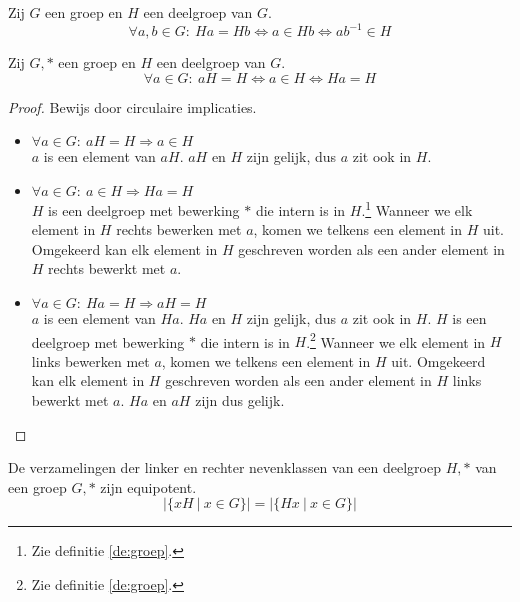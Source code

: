 \documentclass[main.tex]{subfiles}
\begin{document}
\begin{ei}
  \label{ei:rechter-nevenklasse-eig}
  Zij $G$ een groep en $H$ een deelgroep van $G$.
  \[ \forall a,b \in G:\ Ha = Hb \Leftrightarrow a \in Hb \Leftrightarrow ab^{-1} \in H \]

\end{ei}

\begin{ei}
  \label{ei:nevenklasse-eigen-element-gelijk}
  Zij $G,*$ een groep en $H$ een deelgroep van $G$.
  \[ \forall a \in G:\ aH = H \Leftrightarrow a \in H \Leftrightarrow Ha = H \]

  \begin{proof}
    Bewijs door circulaire implicaties.
    \begin{itemize}
    \item $\forall a \in G:\ aH = H \Rightarrow a \in H$\\
      $a$ is een element van $aH$. $aH$ en $H$ zijn gelijk, dus $a$ zit ook in $H$.
    \item $\forall a \in G:\ a \in H \Rightarrow Ha = H$\\
      $H$ is een deelgroep met bewerking $*$ die intern is in $H$.\footnote{Zie definitie \ref{de:groep}.}
      Wanneer we elk element in $H$ rechts bewerken met $a$, komen we telkens een element in $H$ uit.
      Omgekeerd kan elk element in $H$ geschreven worden als een ander element in $H$ rechts bewerkt met $a$.
    \item $\forall a \in G:\ Ha = H \Rightarrow aH = H$\\
      $a$ is een element van $Ha$. $Ha$ en $H$ zijn gelijk, dus $a$ zit ook in $H$.
      $H$ is een deelgroep met bewerking $*$ die intern is in $H$.\footnote{Zie definitie \ref{de:groep}.}
      Wanneer we elk element in $H$ links bewerken met $a$, komen we telkens een element in $H$ uit.
      Omgekeerd kan elk element in $H$ geschreven worden als een ander element in $H$ links bewerkt met $a$.
      $Ha$ en $aH$ zijn dus gelijk.
    \end{itemize}
  \end{proof}
\end{ei}

\begin{st}
  De verzamelingen der linker en rechter nevenklassen van een deelgroep $H,*$ van een groep $G,*$ zijn equipotent.
  \[ |\{ xH\ |\ x \in G \}| = |\{ Hx\ |\ x \in G \}| \]
\end{st}
\end{document}
